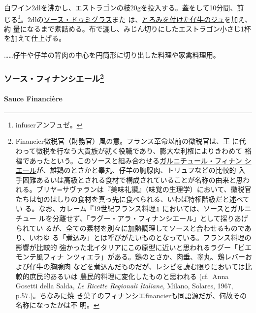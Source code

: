 \begin{recette}
白ワイン2dlを沸かし、エストラゴンの枝20gを投入する。蓋をして10分間、煎
じる\footnote{infuserアンフュゼ。}。2\undemi{}dlの\protect\hyperlink{sauce-demi-glace}{ソース・ドゥミグラス}また
は、\protect\hyperlink{jus-de-veau-lie}{とろみを付けた仔牛のジュ}を加え、約\deuxtiers{}
量になるまで煮詰める。布で漉し、みじん切りにしたエストラゴン小さじ1杯
を加えて仕上げる。

\ldots{}\ldots{}仔牛や仔羊の背肉の中心を円筒形に切り出した料理や家禽料理用。

\maeaki

\hypertarget{ux30bdux30fcux30b9ux30d5ux30a3ux30caux30f3ux30b7ux30a8ux30fcux30eb34}{%
\subsubsection[ソース・フィナンシエール]{\texorpdfstring{ソース・フィナンシエール\footnote{Financier徴税官（財務官）風の意。フランス革命以前の徴税官は、王
  に代わって徴税を行なう大貴族が就く役職であり、膨大な利権によりきわめて
  裕福であったという。このソースと組み合わせる\protect\hyperlink{}{ガルニチュール・フィナン
  シエール}が、雄鶏のとさかと睾丸、仔羊の胸腺肉、トリュフなどの比較的
  入手困難あるいは高級とされる食材で構成されていることが名称の由来と思わ
  れる。ブリヤ=サヴァランは『美味礼讃』（味覚の生理学）において、徴税官
  たちは旬のはしりの食材を真っ先に食べられる、いわば特権階級だと述べてい
  る。なお、カレーム『19世紀フランス料理』においては、ソースとガルニチュー
  ルを分離せず、「ラグー・アラ・フィナンシエール」として採りあげられてい
  るが、全ての素材を別々に加熱調理してソースと合わせるものであり、いわゆ
  る「煮込み」とは呼びがたいものとなっている。フランス料理の影響が比較的
  強かった北イタリアにこの原型に近いと思われるラグー「ピエモンテ風フィナ
  ンツィエラ」がある。鶏のとさか、肉垂、睾丸、鶏レバーおよび仔牛の胸腺肉
  などを煮込んだものだが、レシピを読む限りにおいては比較的庶民的あるいは
  農民的料理に変化したものと思われる (cf.~Anna Gosetti della Salda,
  \emph{Le Ricette Regionali Italiane}, Milano, Solares, 1967,
  p.57.)。ちなみに焼
  き菓子のフィナンシエfinancierも同語源だが、何故その名称になったかは不
  明。}}{ソース・フィナンシエール}}\label{ux30bdux30fcux30b9ux30d5ux30a3ux30caux30f3ux30b7ux30a8ux30fcux30eb34}}

\hypertarget{sauce-financiere}{%
\paragraph{Sauce Financière}\label{sauce-financiere}}


\end{recette}
